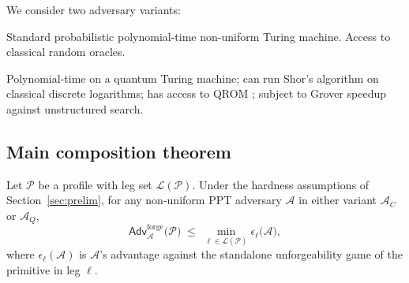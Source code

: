 We consider two adversary variants:
\begin{description}[leftmargin=2em,nosep]
\item[$\mathcal{A}_C$ --- classical PPT.] Standard probabilistic
      polynomial-time non-uniform Turing machine. Access to classical
      random oracles.
\item[$\mathcal{A}_Q$ --- quantum PPT.] Polynomial-time on a quantum
      Turing machine; can run Shor's algorithm on classical discrete
      logarithms; has access to QROM \cite{bellare1993}; subject to
      Grover speedup against unstructured search.
\end{description}

\subsection{Main composition theorem}

\begin{theorem}
\label{thm:composition}
Let $\mathcal{P}$ be a profile with leg set $\mathcal{L}(\mathcal{P})$.
Under the hardness assumptions of Section~\ref{sec:prelim}, for any
non-uniform PPT adversary $\mathcal{A}$ in either variant
$\mathcal{A}_C$ or $\mathcal{A}_Q$,
\[
\mathsf{Adv}^{\mathrm{forge}}_{\mathcal{A}}\bigl(\mathcal{P}\bigr)
\;\leq\;
\min_{\ell \in \mathcal{L}(\mathcal{P})} \epsilon_\ell\bigl(\mathcal{A}\bigr),
\]
where $\epsilon_\ell(\mathcal{A})$ is $\mathcal{A}$'s advantage against
the standalone unforgeability game of the primitive in leg $\ell$.
\end{theorem}

